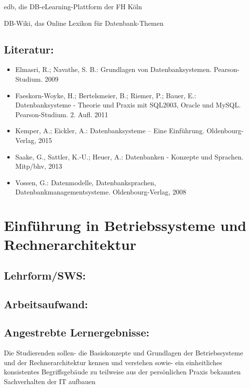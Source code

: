 edb, die DB-eLearning-Plattform der FH Köln

DB-Wiki, das Online Lexikon für Datenbank-Themen

\section{Literatur:}\label{literatur-7}

\begin{itemize}
\item
  Elmasri, R.; Navathe, S. B.: Grundlagen von Datenbanksystemen.
  Pearson-Studium. 2009
\item
  Faeskorn-Woyke, H.; Bertelsmeier, B.; Riemer, P.; Bauer, E.:
  Datenbanksysteme - Theorie und Praxis mit SQL2003, Oracle und MySQL.
  Pearson-Studium. 2. Aufl. 2011
\item
  Kemper, A.; Eickler, A.: Datenbanksysteme -- Eine Einführung.
  Oldenbourg-Verlag, 2015
\item
  Saake, G., Sattler, K.-U.; Heuer, A.: Datenbanken - Konzepte und
  Sprachen. Mitp/bhv, 2013
\item
  Vossen, G.: Datenmodelle, Datenbanksprachen,
  Datenbankmanagementsysteme. Oldenbourg-Verlag, 2008
\end{itemize}

\chapter{Einführung in Betriebssysteme und
Rechnerarchitektur}\label{einfuxfchrung-in-betriebssysteme-und-rechnerarchitektur}

\section{Lehrform/SWS:}\label{lehrformsws-8}

\section{Arbeitsaufwand:}\label{arbeitsaufwand-8}

\section{Angestrebte
Lernergebnisse:}\label{angestrebte-lernergebnisse-8}

Die Studierenden sollen- die Basiskonzepte und Grundlagen der
Betriebssysteme und der Rechnerarchitektur kennen und verstehen sowie-
ein einheitliches konsistentes Begriffsgebäude zu teilweise aus der
persönlichen Praxis bekannten Sachverhalten der IT aufbauen

